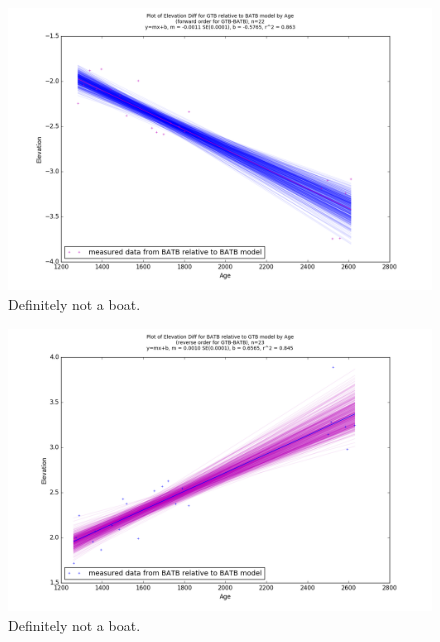 \begin{figure}[h]
	\includegraphics[width=\linewidth]{data/gias/theGIA_GTB_relative_to_BATB.png}
	\caption{Definitely not a boat.}
	\label{fig:gias_GTBxBATB}
\end{figure}
\newpage


\begin{figure}[h]
	\includegraphics[width=\linewidth]{data/gias/theGIA_BATB_relative_to_GTB.png}
	\caption{Definitely not a boat.}
	\label{fig:gias_BATBxGTB}
\end{figure}
\newpage









